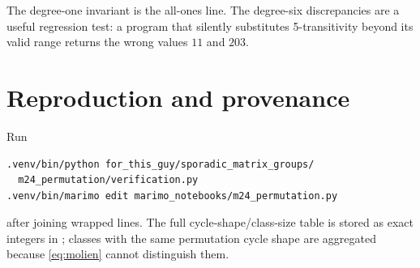 \documentclass[11pt]{article}
\begin{document}
The degree-one invariant is the all-ones line.  The degree-six discrepancies
are a useful regression test: a program that silently substitutes
5-transitivity beyond its valid range returns the wrong values $11$ and
$203$.

\section{Reproduction and provenance}
Run
\begin{verbatim}
.venv/bin/python for_this_guy/sporadic_matrix_groups/
  m24_permutation/verification.py
.venv/bin/marimo edit marimo_notebooks/m24_permutation.py
\end{verbatim}
after joining wrapped lines.  The full cycle-shape/class-size table is stored
as exact integers in ; classes with
the same permutation cycle shape are aggregated because \eqref{eq:molien}
cannot distinguish them.
\end{document}

